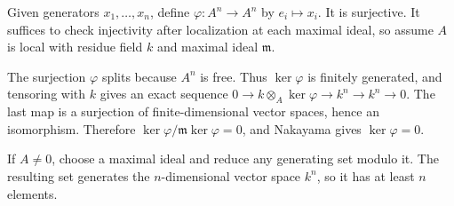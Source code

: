 Given generators $x_1,\ldots,x_n$, define $\varphi:A^n\to A^n$ by $e_i\mapsto x_i$. It is surjective. It suffices to check injectivity after localization at each maximal ideal, so assume $A$ is local with residue field $k$ and maximal ideal $\mathfrak m$.

The surjection $\varphi$ splits because $A^n$ is free. Thus $\ker\varphi$ is finitely generated, and tensoring with $k$ gives an exact sequence $0\to k\otimes_A\ker\varphi\to k^n\to k^n\to0$. The last map is a surjection of finite-dimensional vector spaces, hence an isomorphism. Therefore $\ker\varphi/\mathfrak m\ker\varphi=0$, and Nakayama gives $\ker\varphi=0$.

If $A\ne0$, choose a maximal ideal and reduce any generating set modulo it. The resulting set generates the $n$-dimensional vector space $k^n$, so it has at least $n$ elements.
